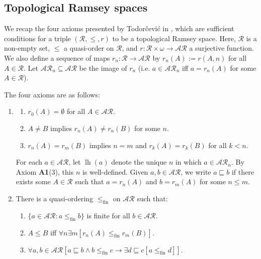 \documentclass[11pt,reqno]{amsart}
\theoremstyle{plain}
\numberwithin{equation}{section}
\theoremstyle{definition}
\newcommand{\func}{\operatorname}
\newcommand{\cal}{\mathcal}
\newcommand{\lh}{\func{lh}}
\newcommand{\fin}{\mathrm{fin}}
\begin{document}
\subsection{Topological Ramsey spaces} 
We recap the four axioms presented by Todor\v{c}evi\'{c} in \cite{T10}, which are sufficient conditions for a triple $(\cal{R},\leq,r)$ to be a topological Ramsey space. Here, $\cal{R}$ is a non-empty set, $\leq$ a quasi-order on $\cal{R}$, and $r : \cal{R} \times \omega \to \cal{AR}$ a surjective function. We also define a sequence of maps $r_n : \cal{R} \to \cal{AR}$ by $r_n(A) := r(A,n)$ for all $A \in \cal{R}$. Let $\cal{AR}_n \subseteq \cal{AR}$ be the image of $r_n$ (i.e. $a \in \cal{AR}_n$ iff $a = r_n(A)$ for some $A \in \cal{R}$). 

The four axioms are as follows:
\begin{enumerate}
    \item[\textbf{(A1)}] 
    \begin{enumerate}[label=(\arabic*)]
        \item $r_0(A) = \emptyset$ for all $A \in \cal{AR}$.

        \item $A \neq B$ implies $r_n(A) \neq r_n(B)$ for some $n$.

        \item $r_n(A) = r_m(B)$ implies $n = m$ and $r_k(A) = r_k(B)$ for all $k < n$.
    \end{enumerate}
    For each $a \in \cal{AR}$, let $\lh(a)$ denote the unique $n$ in which $a \in \cal{AR}_n$. By Axiom \textbf{A1}(3), this $n$ is well-defined. Given $a,b \in \cal{AR}$, we write $a \sqsubseteq b$ if there exists some $A \in \cal{R}$ such that $a = r_n(A)$ and $b = r_m(A)$ for some $n \leq m$.

    \item[\textbf{(A2)}]  There is a quasi-ordering $\leq_\fin$ on $\cal{AR}$ such that:
    \begin{enumerate}[label=(\arabic*)]
        \item $\{a \in \cal{AR} : a \leq_\fin b\}$ is finite for all $b \in \cal{AR}$.

        \item $A \leq B$ iff $\forall n \exists m [r_n(A) \leq_\fin r_m(B)]$.

        \item $\forall a,b \in \cal{AR}[a \sqsubseteq b \wedge b \leq_\fin c \to \exists d \sqsubseteq c[a \leq_\fin d]]$.
    \end{enumerate}


\end{enumerate}
\end{document}
